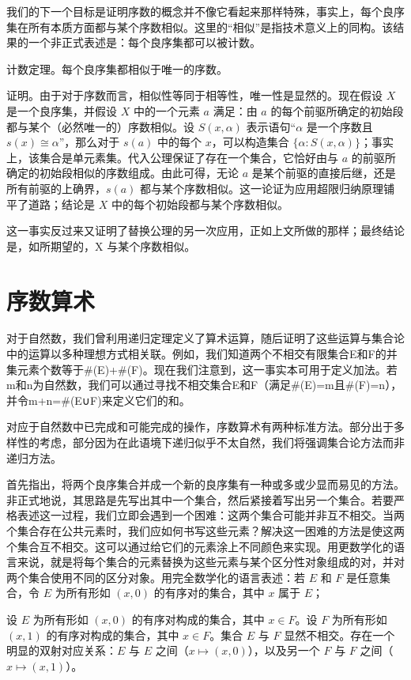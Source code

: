 \documentclass[12pt,a4paper]{ctexbook}
\theoremstyle{definition}
\theoremstyle{remark}
\begin{document}
{我们的下一个目标是证明序数的概念并不像它看起来那样特殊，事实上，每个良序集在所有本质方面都与某个序数相似。这里的“相似”是指技术意义上的同构。该结果的一个非正式表述是：每个良序集都可以被计数。

计数定理。每个良序集都相似于唯一的序数。

证明。由于对于序数而言，相似性等同于相等性，唯一性是显然的。现在假设 \(X\) 是一个良序集，并假设 \(X\) 中的一个元素 \(a\) 满足：由 \(a\) 的每个前驱所确定的初始段都与某个（必然唯一的）序数相似。设 \(S(x, \alpha)\) 表示语句“\(\alpha\) 是一个序数且 \(s(x) \cong \alpha\)”，那么对于 \(s(a)\) 中的每个 \(x\)，可以构造集合 \(\{\alpha : S(x, \alpha)\}\)；事实上，该集合是单元素集。代入公理保证了存在一个集合，它恰好由与 \(a\) 的前驱所确定的初始段相似的序数组成。由此可得，无论 \(a\) 是某个前驱的直接后继，还是所有前驱的上确界，\(s(a)\) 都与某个序数相似。这一论证为应用超限归纳原理铺平了道路；结论是 \(X\) 中的每个初始段都与某个序数相似。

这一事实反过来又证明了替换公理的另一次应用，正如上文所做的那样；最终结论是，如所期望的，X 与某个序数相似。


\chapter{序数算术}

对于自然数，我们曾利用递归定理定义了算术运算，随后证明了这些运算与集合论中的运算以多种理想方式相关联。例如，我们知道两个不相交有限集合E和F的并集元素个数等于\#(E)+\#(F)。现在我们注意到，这一事实本可用于定义加法。若m和n为自然数，我们可以通过寻找不相交集合E和F（满足\#(E)=m且\#(F)=n），并令m+n=\#(E∪F)来定义它们的和。

对应于自然数中已完成和可能完成的操作，序数算术有两种标准方法。部分出于多样性的考虑，部分因为在此语境下递归似乎不太自然，我们将强调集合论方法而非递归方法。

首先指出，将两个良序集合并成一个新的良序集有一种或多或少显而易见的方法。非正式地说，其思路是先写出其中一个集合，然后紧接着写出另一个集合。若要严格表述这一过程，我们立即会遇到一个困难：这两个集合可能并非互不相交。当两个集合存在公共元素时，我们应如何书写这些元素？解决这一困难的方法是使这两个集合互不相交。这可以通过给它们的元素涂上不同颜色来实现。用更数学化的语言来说，就是将每个集合的元素替换为这些元素与某个区分性对象组成的对，并对两个集合使用不同的区分对象。用完全数学化的语言表述：若 \(E\) 和 \(F\) 是任意集合，令 \(E\) 为所有形如 \((x,0)\) 的有序对的集合，其中 \(x\) 属于 \(E\)；

设 \( E \) 为所有形如 \((x,0)\) 的有序对构成的集合，其中 \( x \in F \)。设 \( F \) 为所有形如 \((x,1)\) 的有序对构成的集合，其中 \( x \in F \)。集合 \( E \) 与 \( F \) 显然不相交。存在一个明显的双射对应关系：\( E \) 与 \( E \) 之间（\( x \mapsto (x,0) \)），以及另一个 \( F \) 与 \( F \) 之间（\( x \mapsto (x,1) \)）。

}
\end{document}
